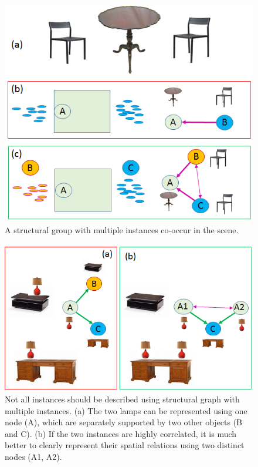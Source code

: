 {\begin{figure}
	\centering
	\includegraphics[width=\columnwidth]{figures/instance_graph_2.png}
	\caption{A structural group with multiple instances co-occur in the scene.}
	\label{fig:multiple_instance_sg}
\end{figure}


\begin{figure}
	\centering
	\includegraphics[width=\columnwidth]{figures/instance_graph_3.png}
	\caption{Not all instances should be described using structural graph with multiple instances. (a) The two lamps can be represented using one node (A), which are separately supported by two other objects (B and C). (b) If the two instances are highly correlated, it is much better to clearly represent their spatial relations using two distinct nodes (A1, A2). }
	\label{fig:multiple_instance_a}
\end{figure}

}


